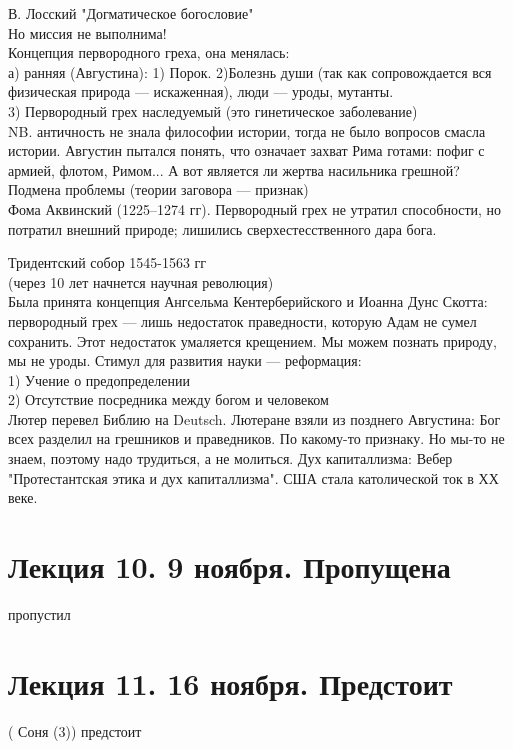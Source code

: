 \documentclass[a4paper,12pt]{article}
\begin{document}
В. Лосский "Догматическое богословие"\\
Но миссия не выполнима!\\
Концепция первородного греха, она менялась:\\
а) ранняя (Августина):
1) Порок. 2)Болезнь души (так как сопровождается вся физическая природа --- искаженная), люди --- уроды, мутанты.\\
3) Первородный грех наследуемый (это гинетическое заболевание)\\
NB. античность не знала философии истории, тогда не было вопросов смасла истории. Августин пытался понять, что означает захват Рима готами: пофиг с армией, флотом, Римом... А вот является ли жертва насильника грешной? Подмена проблемы (теории заговора --- признак)\\
Фома Аквинский (1225--1274 гг). Первородный грех не утратил способности, но потратил внешний природе; лишились сверхестесственного дара бога.

Тридентский собор 1545-1563 гг\\
(через 10 лет начнется научная революция)\\
Была принята концепция Ангсельма Кентерберийского и Иоанна Дунс Скотта: первородный грех --- лишь недостаток праведности, которую Адам не сумел сохранить. Этот недостаток умаляется крещением. Мы можем познать природу, мы не уроды. Стимул для развития науки --- реформация:\\
1) Учение о предопределении\\
2) Отсутствие посредника между богом и человеком\\
Лютер перевел Библию на Deutsch. Лютеране взяли из позднего Августина: Бог всех разделил на грешников и праведников. По какому-то признаку. Но мы-то не знаем, поэтому надо трудиться, а не молиться. Дух капиталлизма: Вебер "Протестантская этика и дух капиталлизма". США стала католической ток в ХХ веке.

\section{Лекция 10. 9 ноября. Пропущена} пропустил
\section{Лекция 11. 16 ноября. Предстоит}
( Соня (3)) предстоит
\end{document}
